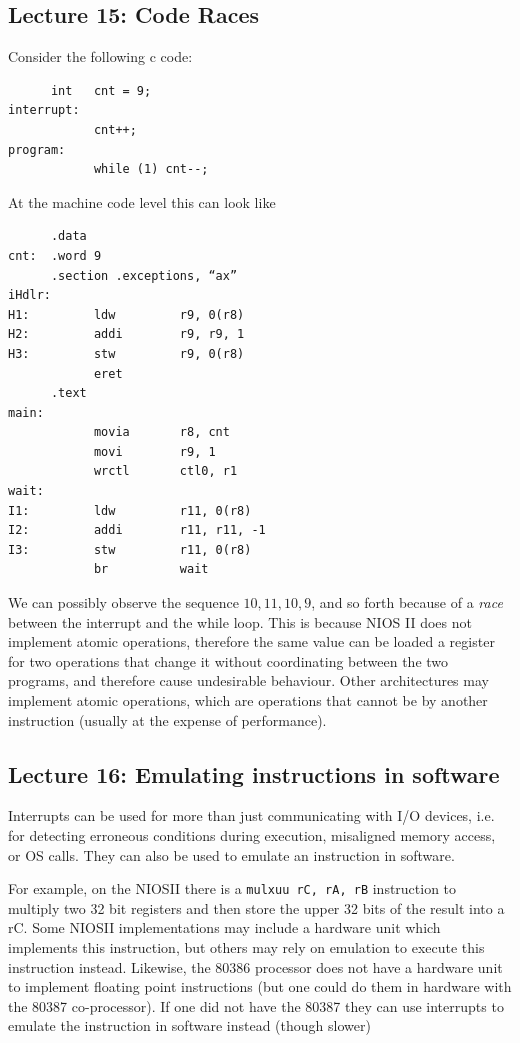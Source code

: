 \documentclass[../notes.tex]{subfiles}
\begin{document}
\subsection{Lecture 15: Code Races}

Consider the following c code:

\begin{listing}[H]
\begin{verbatim}
      int   cnt = 9;
interrupt:
            cnt++;
program:
            while (1) cnt--;
\end{verbatim}
\end{listing}

At the machine code level this can look like

\begin{listing}[H]
\begin{verbatim}
      .data
cnt:  .word 9
      .section .exceptions, “ax”
iHdlr:     
H1:         ldw         r9, 0(r8)
H2:         addi        r9, r9, 1  
H3:         stw         r9, 0(r8)
            eret
      .text
main:
            movia       r8, cnt
            movi        r9, 1
            wrctl       ctl0, r1
wait:      
I1:         ldw         r11, 0(r8)
I2:         addi        r11, r11, -1
I3:         stw         r11, 0(r8)
            br          wait
\end{verbatim}
\end{listing}


We can possibly observe the sequence $ 10, 11, 10, 9$, and so forth because of a \textit{race} between the interrupt and the while loop.
This is because NIOS II does not implement atomic operations, therefore the same value can be loaded a register for two operations that change it without coordinating between the two programs, and therefore cause undesirable behaviour.
Other architectures may implement atomic operations, which are operations that cannot be by another instruction (usually at the expense of performance).


\subsection{Lecture 16: Emulating instructions in software}

Interrupts can be used for more than just communicating with I/O devices, i.e. for detecting erroneous conditions during execution, misaligned memory access, or OS calls.
They can also be used to emulate an instruction in software.

For example, on the NIOSII there is a \texttt{mulxuu rC, rA, rB} instruction to multiply two 32 bit registers and then store the upper 32 bits of the result into a rC.
Some NIOSII implementations may include a hardware unit which implements this instruction, but others may rely on emulation to execute this instruction instead.
Likewise, the 80386 processor does not have a hardware unit to implement floating point instructions (but one could do them in hardware with the 80387 co-processor). If one did not have the 80387 they can use interrupts to emulate the instruction in software instead (though slower)
\end{document}
